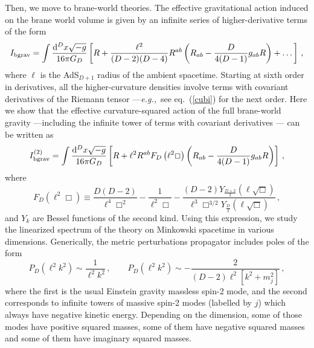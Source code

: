\documentclass[11pt]{article}
\newcommand{\req}[1]{(\ref{#1})} %
\newcommand{\diff}{\mathrm{d}}
\renewcommand{\req}[1]{eq.~(\ref{#1})}
\newcommand{\eg}{{\it e.g.,}\ }
\newcommand{\comment}[1]{{\bf [[[#1]]]}}
\begin{document}
Then, we move to brane-world theories. The effective gravitational action induced on the brane world volume is given by an infinite series of higher-derivative terms of the form \cite{Kraus:1999di,Emparan:1999pm,Balasubramanian:1999re,Papadimitriou:2004ap,Papadimitriou:2010as,Elvang:2016tzz,Bueno:2022log,Anastasiou:2020zwc}
\begin{equation}\notag
I_{\rm bgrav}=\int \frac{ \diff^{D}x\sqrt{-g}}{16\pi G_{D}} \left[  R +\frac{\ell^2}{(D-2)(D-4)} R^{ab}\left( R_{ab}-\frac{D}{4(D-1)}g_{ab}R \right) +\dots\right]\, ,\label{totalactiondd}
\end{equation}
where $\ell$ is the AdS$_{D+1}$ radius of the ambient spacetime. Starting at sixth order in derivatives, all the higher-curvature densities involve terms with covariant derivatives of the Riemann tensor ---\eg see \req{cubi} for the next order. Here we show that the effective curvature-squared action of the full brane-world gravity ---including the infinite tower of terms with covariant derivatives --- can be written as
\begin{align}\notag
I_{\rm bgrav}^{(2)}=\int \frac{\diff^{D}x\sqrt{-g}}{16\pi G_{D}}  \left[R+\ell^2 R^{ab}F_D \left(\ell^2\Box\right) \left( R_{ab}-\frac{D}{4(D-1)} g_{ab }R\right)\right]\, ,\label{totalaction}
\end{align}
where
\begin{equation}
F_{D}(\ell^2\Box)\equiv \frac{D(D-2)}{\ell^4\Box^2}-\frac{1}{\ell^2\Box}-\frac{(D-2)Y_{\frac{D+2}{2}}\left(\ell \sqrt{\Box}\right)}{\ell^3 \Box^{3/2}Y_{\frac{D}{2}}\left(\ell \sqrt{\Box}\right)}\, ,
\end{equation}
and $Y_{k}$ are Bessel functions of the second kind. Using this expression, we study the linearized spectrum of  the theory on Minkowski spacetime in various dimensions. Generically,  the metric perturbations propagator includes poles of the form
\begin{equation}
P_D(\ell^2 k^2) \sim \frac{1}{\ell^2 k^2}\, ,\qquad P_D(\ell^2 k^2) \sim -\frac{2}{(D-2)\ell^2 [k^2+m_j^2]} \, ,
\end{equation}
where the first is the usual Einstein gravity massless spin-2 mode, and the second corresponds to infinite towers of massive spin-2 modes (labelled by $j$) which always have negative kinetic energy. Depending on the dimension, some of those modes have positive squared masses, some of them have negative squared masses and some of them have imaginary squared masses.  
\end{document}
